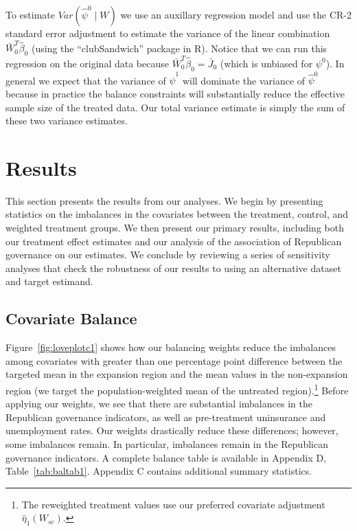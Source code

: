 \documentclass[aoas]{imsart}
\theoremstyle{plain}
\theoremstyle{remark}
\begin{document}
To estimate $Var(\hat{\psi}^0 \mid W)$ we use an auxillary regression model and use the CR-2 standard error adjustment to estimate the variance of the linear combination $\bar{W}_0^T\hat{\beta}_0$ (using the ``clubSandwich'' package in R). Notice that we can run this regression on the original data because $\bar{W}_0^T\hat{\beta}_0 = \bar{J}_0$ (which is unbiased for $\psi^0$). In general we expect that the variance of $\hat{\psi}^1$ will dominate the variance of $\hat{\psi}^0$ because in practice the balance constraints will substantially reduce the effective sample size of the treated data. Our total variance estimate is simply the sum of these two variance estimates.

\section{Results}

This section presents the results from our analyses. We begin by presenting statistics on the imbalances in the covariates between the treatment, control, and weighted treatment groups. We then present our primary results, including both our treatment effect estimates and our analysis of the association of Republican governance on our estimates. We conclude by reviewing a series of sensitivity analyses that check the robustness of our results to using an alternative dataset and target estimand.

\subsection{Covariate Balance}

Figure~\ref{fig:loveplotc1} shows how our balancing weights reduce the imbalances among covariates with greater than one percentage point difference between the targeted mean in the expansion region and the mean values in the non-expansion region (we target the population-weighted mean of the untreated region).\footnote{The reweighted treatment values use our preferred covariate adjustment $\hat{\eta}_1(W_{sc})$.} Before applying our weights, we see that there are substantial imbalances in the Republican governance indicators, as well as pre-treatment uninsurance and unemployment rates. Our weights drastically reduce these differences; however, some imbalances remain. In particular, imbalances remain in the Republican governance indicators. A complete balance table is available in Appendix D, Table~\ref{tab:baltab1}. Appendix C contains additional summary statistics. 
\end{document}
